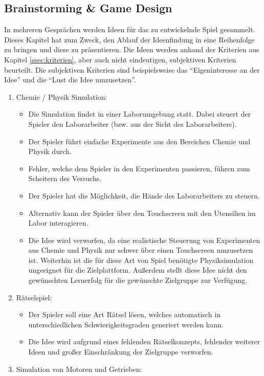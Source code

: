\subsection{Brainstorming \& Game Design}\label{ssec:idee}
	In mehreren Gesprächen werden Ideen für das zu entwickelnde Spiel gesammelt. Dieses Kapitel hat zum Zweck, den Ablauf der Ideenfindung in eine Reihenfolge zu bringen und diese zu präsentieren.
	Die Ideen werden anhand der Kriterien aus Kapitel \ref{ssec:kriterien}, aber auch nicht eindeutigen, subjektiven Kriterien beurteilt. Die subjektiven Kriterien sind beispielsweise das \enquote{Eigeninteresse an der Idee} und die \enquote{Lust die Idee umzusetzen}.
	\begin{enumerate}
		\item{Chemie / Physik Simulation:}
		\begin{itemize}
			\item{Die Simulation findet in einer Laborumgebung statt. Dabei steuert der Spieler den Laborarbeiter (bzw. aus der Sicht des Laborarbeiters).}
			\item{Der Spieler führt einfache Experimente aus den Bereichen Chemie und Physik durch.}
			\item{Fehler, welche dem Spieler in den Experimenten passieren, führen zum Scheitern des Versuchs.}
			\item{Der Spieler hat die Möglichkeit, die Hände des Laborarbeiters zu steuern.}
			\item{Alternativ kann der Spieler über den Touchscreen mit den Utensilien im Labor interagieren.}
			\item{Die Idee wird verworfen, da eine realistische Steuerung von Experimenten aus Chemie und Physik nur schwer über einen Touchscreen umzusetzen ist. Weiterhin ist die für diese Art von Spiel benötigte Physiksimulation ungeeignet für die Zielplattform. Außerdem stellt diese Idee nicht den gewünschten Lernerfolg für die gewünschte Zielgruppe zur Verfügung. }
		\end{itemize}
		\item{Rätselspiel:}
		\begin{itemize}
			\item{Der Spieler soll eine Art Rätsel lösen, welches automatisch in unterschiedlichen Schwierigkeitsgraden generiert werden kann.}
			\item{Die Idee wird aufgrund eines fehlenden Rätselkonzepts, fehlender weiterer Ideen und großer Einschränkung der Zielgruppe verworfen.}
		\end{itemize}
		\item{Simulation von Motoren und Getrieben:}

\end{enumerate}
